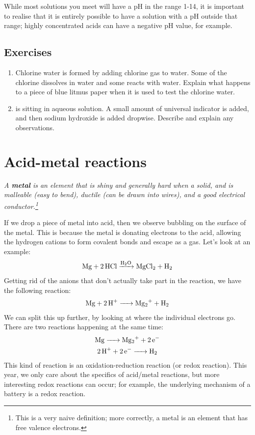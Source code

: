 \documentclass[a4paper]{memoir}
\begin{document}
While most solutions you meet will have a pH in the range 1-14, it is important to realise that it is entirely possible to have a solution
with a pH outside that range; highly concentrated acids can have a negative pH value, for example.

\subsection*{Exercises}
\begin{enumerate}
  \item Chlorine water is formed by adding chlorine gas to water. Some of the chlorine dissolves in water and some reacts with water. Explain
        what happens to a piece of blue litmus paper when it is used to test the chlorine water.
  \item {} is sitting in aqueous solution. A small amount of universal indicator is added, and then sodium hydroxide is added dropwise.
        Describe and explain any observations.
\end{enumerate}

\section{Acid-metal reactions}

{\itshape
  A \textbf{metal} is an element that is shiny and generally hard when a solid, and is malleable (easy to bend), ductile (can be drawn into wires),
  and a good electrical conductor.\footnote{This is a very naive definition; more correctly, a metal is an element that has free valence electrons.}
}

If we drop a piece of metal into acid, then we observe bubbling on the surface of the metal. This is because the metal is donating electrons to the
acid, allowing the hydrogen cations to form covalent bonds and escape as a gas. Let's look at an example:
\begin{displaymath}
  \ce{Mg + 2HCl ->[H2O] MgCl2 + H2}
\end{displaymath}
Getting rid of the  anions that don't actually take part in the reaction, we have the following reaction:
\begin{equation}
  \ce{Mg + 2H+ -> Mg2+ + H2}
\end{equation}
We can split this up further, by looking at where the individual electrons go. There are two reactions happening at the same time:
\begin{gather}
  \ce{Mg -> Mg2+ + 2e-}\\
  \ce{2H+ + 2e- -> H2}
\end{gather}
This kind of reaction is an oxidation-reduction reaction (or redox reaction). This year, we only care about the specifics of acid/metal
reactions, but more interesting redox reactions can occur; for example, the underlying mechanism of a battery is a redox reaction.
\end{document}
